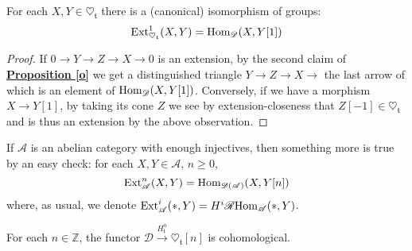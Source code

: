 \begin{prop}
For each $X,Y \in \heartsuit_{\mathfrak{t}}$ there is a (canonical) isomorphism of groups:  $$\textnormal{Ext}^1_{\heartsuit_{\mathfrak{t}}}(X,Y)=\textnormal{Hom}_{\mathscr{D}}(X,Y[1])$$ 
\end{prop}

\begin{proof}
If $0 \longrightarrow Y \longrightarrow Z \longrightarrow X \longrightarrow 0$ is an extension, by the second claim of \hyperref[o]{\textbf{Proposition \ref*{o}}} we get a distinguished triangle $Y \longrightarrow Z \longrightarrow X \longrightarrow$ the last arrow of which is an element of $\textnormal{Hom}_{\mathscr{D}}(X,Y[1])$. Conversely, if we have a morphism $X \longrightarrow Y[1]$, by taking its cone $Z$ we see by extension-closeness that $Z[-1] \in \heartsuit_{\mathfrak{t}}$ and is thus an extension by the above observation.  
\end{proof}

\begin{exmp}\label{lla}
If $\mathscr{A}$ is an abelian category with enough injectives, then something more is true by an easy check: for each $X,Y \in \mathscr{A}$, $n \ge 0$, $$\textnormal{Ext}_{\mathscr{A}}^n(X,Y)=\textnormal{Hom}_{\mathscr{D}(\mathscr{A})}(X,Y[n])$$
where, as usual, we denote $\textnormal{Ext}_{\mathscr{A}}^i(*,Y)=H^i\mathscr{R}\textnormal{Hom}_{\mathscr{A}}(*,Y)$.
\end{exmp}

\begin{prop}
For each $n \in \mathbb{Z}$, the functor $\mathscr{D} \overset{H^n_{\mathfrak{t}}}{\longrightarrow} \heartsuit_{\mathfrak{t}}[n]$  is cohomological. 
\end{prop}

